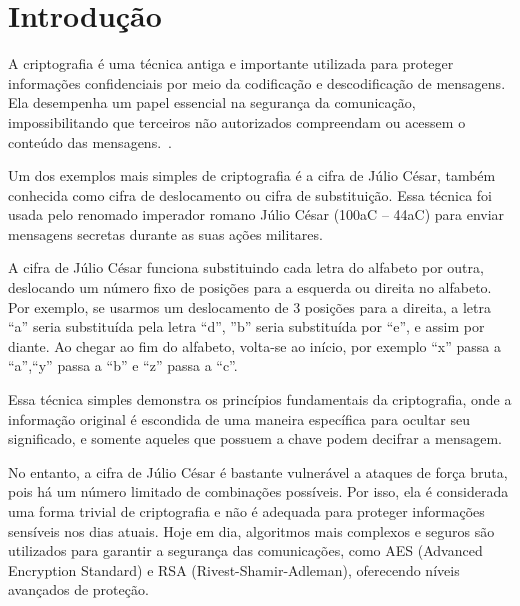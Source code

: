 

\chapter{Introdução}


A criptografia é uma técnica antiga e importante utilizada para proteger informações confidenciais por meio da codificação e descodificação de mensagens. Ela desempenha um papel essencial na segurança da comunicação, impossibilitando que terceiros não autorizados compreendam ou acessem o conteúdo das mensagens.~\cite{Quaresma2008a,Quaresma2009a}.

Um dos exemplos mais simples de criptografia é a cifra de Júlio César, também conhecida como cifra de deslocamento ou cifra de substituição. Essa técnica foi usada pelo renomado imperador romano Júlio César (100aC -- 44aC) para enviar mensagens secretas durante as suas ações militares.

A cifra de Júlio César funciona substituindo cada letra do alfabeto por outra, deslocando um número fixo de posições para a esquerda ou direita no alfabeto. Por exemplo, se usarmos um deslocamento de 3 posições para a direita, a letra ``a'' seria substituída pela letra ``d'', ''b'' seria substituída por ``e'', e assim por diante. Ao chegar ao fim do alfabeto, volta-se ao início, por exemplo ``x'' passa a ``a'',``y'' passa a ``b'' e ``z'' passa a ``c''.

Essa técnica simples demonstra os princípios fundamentais da criptografia, onde a informação original é escondida de uma maneira específica para ocultar seu significado, e somente aqueles que possuem a chave podem decifrar a mensagem.

No entanto, a cifra de Júlio César é bastante vulnerável a ataques de força bruta, pois há um número limitado de combinações possíveis. Por isso, ela é considerada uma forma trivial de criptografia e não é adequada para proteger informações sensíveis nos dias atuais. Hoje em dia, algoritmos mais complexos e seguros são utilizados para garantir a segurança das comunicações, como AES (Advanced Encryption Standard) e RSA (Rivest-Shamir-Adleman), oferecendo níveis avançados de proteção.